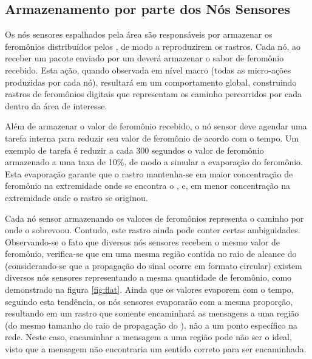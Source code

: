 \subsection{Armazenamento por parte dos Nós Sensores}
Os nós sensores espalhados pela área são responsáveis por armazenar os feromônios distribuídos pelos \vants, de modo a reproduzirem os rastros. Cada nó, ao receber um pacote enviado por um \vant deverá armazenar o sabor de feromônio recebido. Esta ação, quando observada em nível macro (todas as micro-ações produzidas por cada nó), resultará em um comportamento global, construindo rastros de feromônios digitais que representam os caminho percorridos por cada \vant dentro da área de interesse. 

Além de armazenar o valor de feromônio recebido, o nó sensor deve agendar uma tarefa interna para reduzir seu valor de feromônio de acordo com o tempo. Um exemplo de tarefa é reduzir a cada 300 segundos o valor de feromônio armazenado a uma taxa de 10\%, de modo a simular a evaporação do feromônio. Esta evaporação garante que o rastro mantenha-se em maior concentração de feromônio na extremidade onde se encontra o \vant, e, em menor concentração na extremidade onde o rastro se originou.

Cada nó sensor armazenando os valores de feromônios representa o caminho por onde o \vant sobrevoou. Contudo, este rastro ainda pode conter certas ambiguidades. Observando-se o fato que diversos nós sensores recebem o mesmo valor de feromônio, verifica-se que em uma mesma região contida no raio de alcance do \vant (considerando-se que a propagação do sinal ocorre em formato circular) existem diversos nós sensores representando a mesma quantidade de feromônio, como demonstrado na figura \ref{fig:flat}. Ainda que os valores evaporem com o tempo, seguindo esta tendência, os nós sensores evaporarão com a mesma proporção, resultando em um rastro que somente encaminhará as mensagens a uma região (do mesmo tamanho do raio de propagação do \vant), não a um ponto específico na rede. Neste caso, encaminhar a mensagem a uma região pode não ser o ideal, visto que a mensagem não encontraria um sentido correto para ser encaminhada.

